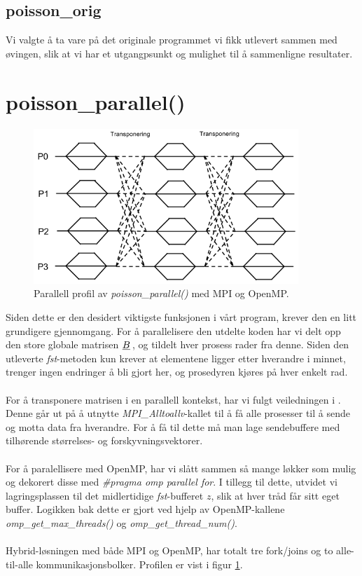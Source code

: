 \documentclass{article}
\newcommand{\ub}[1]{\underbar{$#1$}\,}
\begin{document}
\subsection{poisson\_orig}
Vi valgte å ta vare på det originale programmet vi fikk utlevert sammen med øvingen, slik at vi har et utgangpsunkt og mulighet til å sammenligne resultater.


\section{poisson\_parallel()}
\begin{figure}[t]
	\centering
	\includegraphics[width=10cm]{img/poisson_parallel.png}	
	\caption{Parallell profil av \emph{poisson\_parallel()} med MPI og OpenMP.}
	\label{fig:poisson-parallel}
	
\end{figure}
\label{section:poisson_parallel}
Siden dette er den desidert viktigste funksjonen i vårt program, krever den en litt grundigere gjennomgang. For å parallelisere den utdelte koden har vi delt opp den store globale matrisen $\ub{B}$, og tildelt hver prosess rader fra denne. Siden den utleverte \emph{fst}-metoden kun krever at elementene ligger etter hverandre i minnet, trenger ingen endringer å bli gjort her, og prosedyren kjøres på hver enkelt rad.\\
\\
For å transponere matrisen i en parallell kontekst, har vi fulgt veiledningen i \cite{fast-poisson}. Denne går ut på å utnytte \emph{MPI\_Alltoallv}-kallet til å få alle prosesser til å sende og motta data fra hverandre. For å få til dette må man lage sendebuffere med tilhørende størrelses- og forskyvningsvektorer.\\
\\
For å paralellisere med OpenMP, har vi slått sammen så mange løkker som mulig og dekorert disse med \emph{\#pragma omp parallel for}. I tillegg til dette, utvidet vi lagringsplassen til det midlertidige \emph{fst}-bufferet $z$, slik at hver tråd får sitt eget buffer. Logikken bak dette er gjort ved hjelp av OpenMP-kallene \emph{omp\_get\_max\_threads()} og \emph{omp\_get\_thread\_num()}.\\
\\
Hybrid-løsningen med både MPI og OpenMP, har totalt tre fork/joins og to alle-til-alle kommunikasjonsbolker. Profilen er vist i figur \ref{fig:poisson-parallel}. 
\end{document}
